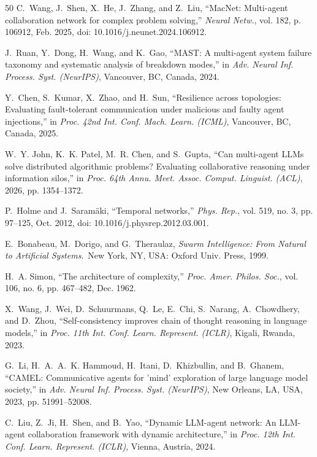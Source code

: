 \documentclass{ieeeaccess}
\begin{document}
\begin{thebibliography}{50}
C.~Wang, J.~Shen, X.~He, J.~Zhang, and Z.~Liu, ``MacNet: Multi-agent collaboration network for complex problem solving,'' \emph{Neural Netw.}, vol. 182, p. 106912, Feb. 2025, doi: 10.1016/j.neunet.2024.106912.

J.~Ruan, Y.~Dong, H.~Wang, and K.~Gao, ``MAST: A multi-agent system failure taxonomy and systematic analysis of breakdown modes,'' in \emph{Adv. Neural Inf. Process. Syst. (NeurIPS)}, Vancouver, BC, Canada, 2024.

Y.~Chen, S.~Kumar, X.~Zhao, and H.~Sun, ``Resilience across topologies: Evaluating fault-tolerant communication under malicious and faulty agent injections,'' in \emph{Proc. 42nd Int. Conf. Mach. Learn. (ICML)}, Vancouver, BC, Canada, 2025.

W.~Y. John, K.~K. Patel, M.~R. Chen, and S.~Gupta, ``Can multi-agent LLMs solve distributed algorithmic problems? Evaluating collaborative reasoning under information silos,'' in \emph{Proc. 64th Annu. Meet. Assoc. Comput. Linguist. (ACL)}, 2026, pp. 1354--1372.

P.~Holme and J.~Saram{\"a}ki, ``Temporal networks,'' \emph{Phys. Rep.}, vol. 519, no. 3, pp. 97--125, Oct. 2012, doi: 10.1016/j.physrep.2012.03.001.

E.~Bonabeau, M.~Dorigo, and G.~Theraulaz, \emph{Swarm Intelligence: From Natural to Artificial Systems}.\ New York, NY, USA: Oxford Univ. Press, 1999.

H.~A. Simon, ``The architecture of complexity,'' \emph{Proc. Amer. Philos. Soc.}, vol. 106, no. 6, pp. 467--482, Dec. 1962.

X.~Wang, J.~Wei, D.~Schuurmans, Q.~Le, E.~Chi, S.~Narang, A.~Chowdhery, and D.~Zhou, ``Self-consistency improves chain of thought reasoning in language models,'' in \emph{Proc. 11th Int. Conf. Learn. Represent. (ICLR)}, Kigali, Rwanda, 2023.

G.~Li, H.~A.~A.~K. Hammoud, H.~Itani, D.~Khizbullin, and B.~Ghanem, ``CAMEL: Communicative agents for 'mind' exploration of large language model society,'' in \emph{Adv. Neural Inf. Process. Syst. (NeurIPS)}, New Orleans, LA, USA, 2023, pp. 51991--52008.

C.~Liu, Z.~Ji, H.~Shen, and B.~Yao, ``Dynamic LLM-agent network: An LLM-agent collaboration framework with dynamic architecture,'' in \emph{Proc. 12th Int. Conf. Learn. Represent. (ICLR)}, Vienna, Austria, 2024.


\end{thebibliography}
\end{document}
